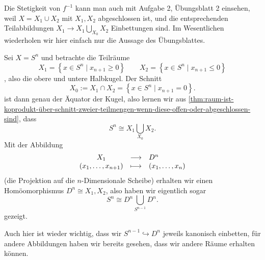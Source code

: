 \begin{remark*}
    Die Stetigkeit von $f^{-1}$ kann man auch mit Aufgabe 2, Übungsblatt 2 einsehen, weil $X = X_1 \cup X_2$ mit $X_1,X_2$ abgeschlossen ist, und die entsprechenden Teilabbildungen $X_1 \to X_1 \bigcup_{X_0} X_2$ Einbettungen sind. Im Wesentlichen wiederholen wir hier einfach nur die Aussage des Übungsblattes.
\end{remark*}

\begin{example}
    Sei $X = S^n$ und betrachte die Teilräume  \[
        X_1 = \left \{x\in S^n \mid  x_{n+1}\geq 0\right\} \qquad X_2 = \left \{x\in S^n \mid  x_{n+1} \leq 0\right\} 
    \]
    , also die obere und untere Halbkugel. Der Schnitt
    \[
    X_0 := X_1 \cap  X_2 = \left \{x\in S^n \mid  x_{n+1} = 0\right\} 
    .\] 
    ist dann genau der Äquator der Kugel, also lernen wir aus \autoref{thm:raum-ist-koprodukt-über-schnitt-zweier-teilmengen-wenn-diese-offen-oder-abgeschlossen-sind}, dass
     \[
    S^n \cong X_1 \bigcup_{X_0} X_2 
    .\] 
    Mit der Abbildung
        \begin{equation*}
        \begin{array}{c c l} 
        X_1 & \longrightarrow & D^n \\
        (x_1,\ldots,x_{n+1}) & \longmapsto &  (x_1,\ldots,x_n)
        \end{array}
    \end{equation*}
    (die Projektion auf die $n$-Dimensionale Scheibe) erhalten wir einen Homöomorphismus  $D^n \cong X_1, X_2$, also haben wir eigentlich sogar
    \[
    S^n \cong D^n \bigcup_{S^{n-1}} D^n
    .\] 
    gezeigt.
    \begin{warning}
        Auch hier ist wieder wichtig, dass wir $S^{n-1}\hookrightarrow D^n$ jeweils kanonisch einbetten, für andere Abbildungen haben wir bereits gesehen, dass wir andere Räume erhalten können.
    \end{warning}
\end{example}
